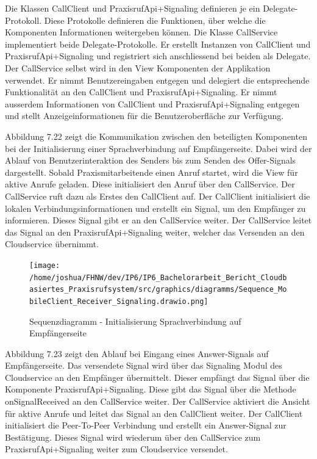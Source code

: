 Die Klassen CallClient und PraxisrufApi+Signaling definieren je ein Delegate-Protokoll.
Diese Protokolle definieren die Funktionen, über welche die Komponenten Informationen weitergeben können.
Die Klasse CallService implementiert beide Delegate-Protokolle.
Er erstellt Instanzen von CallClient und PraxisrufApi+Signaling und registriert sich anschliessend bei beiden als Delegate.
Der CallService selbst wird in den View Komponenten der Applikation verwendet.
Er nimmt Benutzereingaben entgegen und delegiert die entsprechende Funktionalität an den CallClient und PraxisrufApi+Signaling.
Er nimmt ausserdem Informationen von CallClient und PraxisrufApi+Signaling entgegen und stellt Anzeigeinformationen für die Benutzeroberfläche zur Verfügung.

Abbildung 7.22 zeigt die Kommunikation zwischen den beteiligten Komponenten bei der Initialisierung einer Sprachverbindung auf Empfängerseite.
Dabei wird der Ablauf von Benutzerinteraktion des Senders bis zum Senden des Offer-Signals dargestellt.
Sobald Praxismitarbeitende einen Anruf startet, wird die View für aktive Anrufe geladen.
Diese initialisiert den Anruf über den CallService.
Der CallService ruft dazu als Erstes den CallClient auf.
Der CallClient initialisiert die lokalen Verbindungsinformationen und erstellt ein Signal, um den Empfänger zu informieren.
Dieses Signal gibt er an den CallService weiter.
Der CallService leitet das Signal an den PraxisrufApi+Signaling weiter, welcher das Versenden an den Cloudservice übernimmt.

\begin{figure}[h]
    \centering
    \begin{minipage}[b]{0.85\textwidth}
        \texttt{[image: /home/joshua/FHNW/dev/IP6/IP6\_Bachelorarbeit\_Bericht\_Cloudbasiertes\_Praxisrufsystem/src/graphics/diagramms/Sequence\_MobileClient\_Receiver\_Signaling.drawio.png]}
        \caption{Sequenzdiagramm - Initialisierung Sprachverbindung auf Empfängerseite }
    \end{minipage}
\end{figure}


Abbildung 7.23 zeigt den Ablauf bei Eingang eines Answer-Signals auf Empfängerseite.
Das versendete Signal wird über das Signaling Modul des Cloudservice an den Empfänger übermittelt.
Dieser empfängt das Signal über die Komponente PraxisrufApi+Signaling.
Diese gibt das Signal über die Methode onSignalReceived an den CallService weiter.
Der CallService aktiviert die Ansicht für aktive Anrufe und leitet das Signal an den CallClient weiter.
Der CallClient initialisiert die Peer-To-Peer Verbindung und erstellt ein Answer-Signal zur Bestätigung.
Dieses Signal wird wiederum über den CallService zum PraxisrufApi+Signaling weiter zum Cloudservice versendet.


